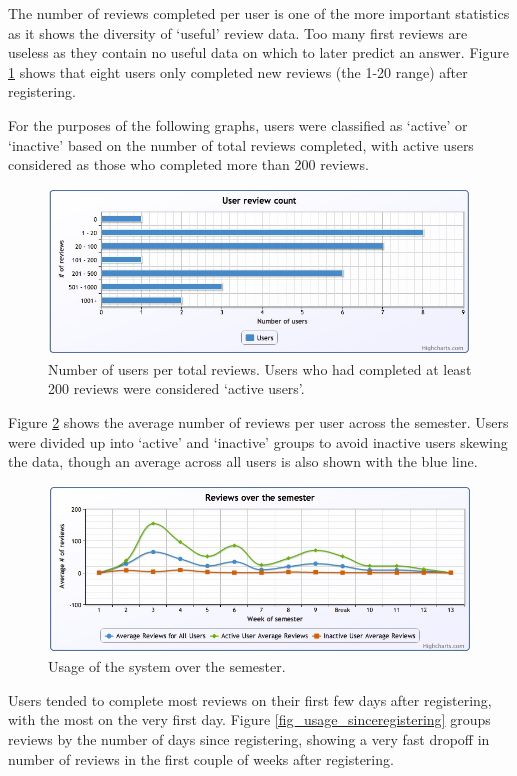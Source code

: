 The number of reviews completed per user is one of the more important statistics as
it shows the diversity of `useful' review data. Too many first reviews are useless as
they contain no useful data on which to later predict an answer.
Figure \ref{fig_usage_reviewcount} shows that eight users only completed new
reviews (the 1-20 range) after registering.

For the purposes of the following graphs, users were classified as `active' or `inactive'
based on the number of total reviews completed, with active users considered as those
who completed more than 200 reviews.

\begin{figure}[h!]
\includegraphics[width=12cm]{img/usage_reviewcount.jpg}
\caption{Number of users per total reviews. Users who had completed 
at least 200 reviews were considered `active users'.}
\label{fig_usage_reviewcount}
\end{figure}

Figure \ref{fig_usage_semester} shows the average number of reviews per user across the
semester. Users were divided up into `active' and `inactive' groups to avoid inactive
users skewing the data, though an average across all users is also shown with the blue line.

\begin{figure}[h!]
\includegraphics[width=12cm]{img/usage_semester.jpg}
\caption{Usage of the system over the semester.}
\label{fig_usage_semester}
\end{figure}

Users tended to complete most reviews on their first few days after registering,
with the most on the very first day. Figure \ref{fig_usage_sinceregistering} groups
reviews by the number of days since registering, showing a very fast dropoff in
number of reviews in the first couple of weeks after registering.

